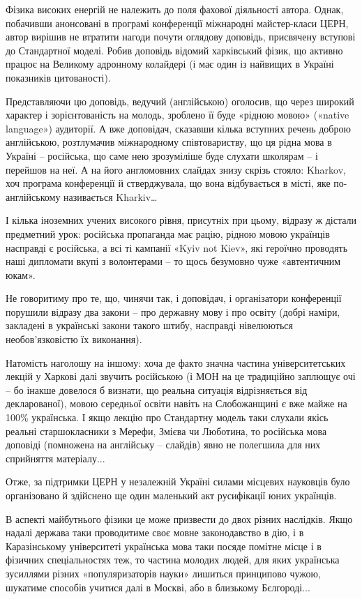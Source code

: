 Фізика високих енергій не належить до поля фахової діяльності автора. Однак,
побачивши анонсовані в програмі конференції міжнародні майстер-класи ЦЕРН,
автор вирішив не втратити нагоди почути оглядову доповідь, присвячену вступові
до Стандартної моделі. Робив доповідь відомий харківський фізик, що активно
працює на Великому адронному колайдері (і має один із найвищих в Україні
показників цитованості).

Представляючи цю доповідь, ведучий (англійською) оголосив, що через широкий
характер і зорієнтованість на молодь, зроблено її буде «рідною мовою» («native
language») аудиторії. А вже доповідач, сказавши кілька вступних речень доброю
англійською, розтлумачив міжнародному співтовариству, що ця рідна мова в
Україні – російська, що саме нею зрозуміліше буде слухати школярам – і перейшов
на неї. А на його англомовних слайдах знизу скрізь стояло: Kharkov, хоч
програма конференції й стверджувала, що вона відбувається в місті, яке
по-англійському називається Kharkiv…

І кілька іноземних учених високого рівня, присутніх при цьому, відразу ж
дістали предметний урок: російська пропаганда має рацію, рідною мовою українців
насправді є російська, а всі ті кампанії «Kyiv not Kiev», які героїчно
проводять наші дипломати вкупі з волонтерами – то щось безумовно чуже
«автентичним юкам».

Не говоритиму про те, що, чинячи так, і доповідач, і організатори конференції
порушили відразу два закони – про державну мову і про освіту (добрі наміри,
закладені в українські закони такого штибу, насправді нівелюються
необов’язковістю їх виконання). 

Натомість наголошу на іншому: хоча де факто значна частина університетських
лекцій у Харкові далі звучить російською (і МОН на це традиційно заплющує очі –
бо інакше довелося б визнати, що реальна ситуація  відрізняється від
декларованої), мовою середньої освіти навіть на Слобожанщині є вже майже на
100\% українська. І якщо лекцію про Стандартну модель таки слухали якісь реальні
старшокласники з Мерефи, Змієва чи Люботина, то російська мова доповіді
(помножена на англійську – слайдів) явно не полегшила для них сприйняття
матеріалу...

Отже, за підтримки ЦЕРН у незалежній Україні силами місцевих науковців було
організовано  й здійснено ще один маленький акт русифікації юних українців. 

В аспекті майбутнього фізики це може призвести до двох різних наслідків. Якщо
надалі держава таки проводитиме своє мовне законодавство в дію, і в
Каразінському університеті українська мова таки посяде помітне місце і в
фізичних спеціальностях теж, то частина молодих людей, для яких українська
зусиллями різних «популяризаторів науки» лишиться принципово чужою, шукатиме
способів учитися далі в Москві, або в близькому Бєлгороді... 

